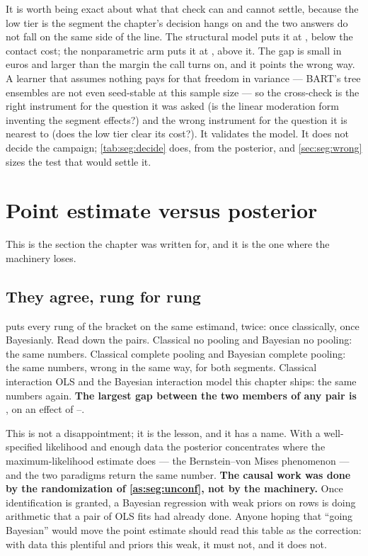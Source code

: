 It is worth being exact about what that check can and cannot settle, because the low tier is the
segment the chapter's decision hangs on and the two answers do not fall on the same side of the
line. The structural model puts it at \eur{\nbTwoCateLow}, below the \eur{\nbTwoCost} contact cost;
the nonparametric arm puts it at \eur{\nbTwoBartLow}, above it. The gap is small in euros and larger
than the margin the call turns on, and it points the wrong way. A learner that assumes nothing pays
for that freedom in variance --- BART's tree ensembles are not even seed-stable at this sample size
--- so the cross-check is the right instrument for the question it was asked (is the linear
moderation form inventing the segment effects?) and the wrong instrument for the question it is
nearest to (does the low tier clear its cost?). It validates the model. It does not decide the
campaign; \cref{tab:seg:decide} does, from the posterior, and \cref{sec:seg:wrong} sizes the test
that would settle it.

\section{Point estimate versus posterior}
\label{sec:seg:compare}



This is the section the chapter was written for, and it is the one where the machinery loses.

\subsection*{They agree, rung for rung}

 puts every rung of the bracket on the same estimand, twice: once classically,
once Bayesianly. Read down the pairs. Classical no pooling and Bayesian no pooling: the same
numbers. Classical complete pooling and Bayesian complete pooling: the same numbers, wrong in the
same way, for both segments. Classical interaction OLS and the Bayesian interaction model this
chapter ships: the same numbers again. \textbf{The largest gap between the two members of any pair
is \eur{\nbTwoMaxPairGap}}, on an effect of \eur{\nbTwoTrueLow}--\eur{\nbTwoTrueHigh}.

This is not a disappointment; it is the lesson, and it has a name. With a well-specified likelihood
and enough data the posterior concentrates where the maximum-likelihood estimate does --- the
Bernstein--von Mises phenomenon \citep{gelman2013, kleijn2012} --- and the two paradigms return the
same number. \textbf{The causal work was done by the randomization of \cref{as:seg:unconf}, not by
the machinery.} Once identification is granted, a Bayesian regression with weak priors on
\nbTwoN{} rows is doing arithmetic that a pair of OLS fits had already done. Anyone hoping that
``going Bayesian'' would move the point estimate should read this table as the correction: with data
this plentiful and priors this weak, it must not, and it does not.

